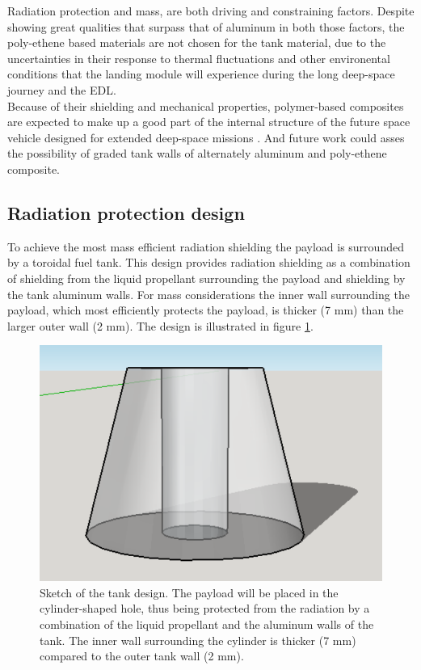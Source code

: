 Radiation protection and mass, are both driving and constraining factors. Despite showing great qualities that surpass that of aluminum in both those factors, the poly-ethene based materials are not chosen for the tank material, due to the uncertainties in their response to thermal fluctuations and other environental conditions that the landing module will experience during the long deep-space journey and the EDL. \\


Because of their shielding and mechanical properties, polymer-based composites
are expected to make up a good part of the internal structure of the future space vehicle designed for
extended deep-space missions  \cite{rad_shield_2006}. And future work could asses the possibility of graded tank walls of alternately aluminum and poly-ethene composite. 


\subsection{Radiation protection design}
To achieve the most mass efficient radiation shielding the payload is surrounded by a toroidal fuel tank. This design provides radiation shielding as a combination of shielding from the liquid propellant surrounding the payload and shielding by the tank aluminum walls. For mass considerations the inner wall surrounding the payload, which most efficiently protects the payload, is thicker (7 mm) than the larger outer wall (2 mm). The design is illustrated in figure \ref{fig:tankdesign}.

\begin{figure}[htb]
\begin{center}
\includegraphics[scale=0.7]{figures/navtheory/tank}
\caption{Sketch of the tank design. The payload will be placed in the cylinder-shaped hole, thus being protected from the radiation by a combination of the liquid propellant and the aluminum walls of the tank. The inner wall surrounding the cylinder is thicker (7 mm) compared to the outer tank wall (2 mm). }
\label{fig:tankdesign}
\end{center}
\end{figure}

